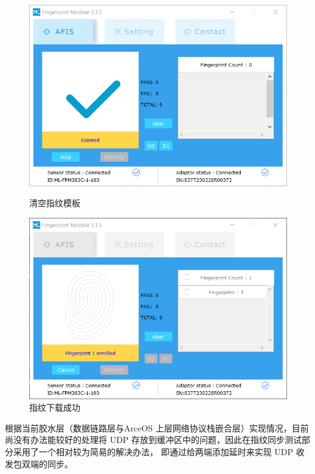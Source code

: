    \noindent
    \begin{figure}[ht]
        \begin{minipage}[t]{0.48\linewidth}
            \includegraphics[width=\textwidth]{./imgs/清空指纹模板.png}
            \caption{清空指纹模板} \label{tests::清空指纹模板}
        \end{minipage}
        \begin{minipage}[t]{0.48\linewidth}
            \includegraphics[width=\textwidth]{./imgs/注册指纹.png}
            \caption{指纹下载成功} \label{tests::指纹下载成功}
        \end{minipage}
    \end{figure}

    根据当前胶水层（数据链路层与ArceOS 上层网络协议栈嵌合层）实现情况，目前尚没有办法能较好的处理将 UDP 存放到缓冲区中的问题，因此在指纹同步测试部分采用了一个相对较为简易的解决办法，
    即通过给两端添加延时来实现 UDP 收发包双端的同步。

